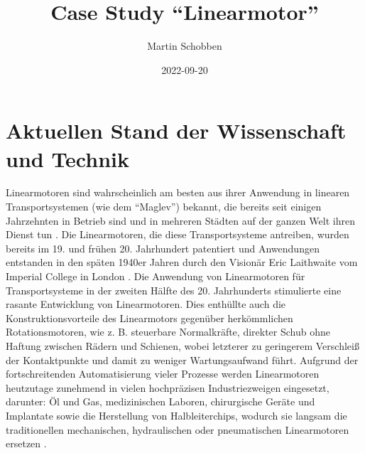 \documentclass[
  oneside]{book}
\title{Case Study ``Linearmotor''}
\author{Martin Schobben}
\date{2022-09-20}
\begin{document}
\maketitle

{
\setcounter{tocdepth}{1}
\tableofcontents
}
\hypertarget{aktuellen-stand-der-wissenschaft-und-technik}{%
\section{Aktuellen Stand der Wissenschaft und Technik}\label{aktuellen-stand-der-wissenschaft-und-technik}}

Linearmotoren sind wahrscheinlich am besten aus ihrer Anwendung in linearen Transportsystemen (wie dem ``Maglev'') bekannt, die bereits seit einigen Jahrzehnten in Betrieb sind und in mehreren Städten auf der ganzen Welt ihren Dienst tun \citep{hellinger2009, palka2021}. Die Linearmotoren, die diese Transportsysteme antreiben, wurden bereits im 19. und frühen 20. Jahrhundert patentiert und Anwendungen entstanden in den späten 1940er Jahren durch den Visionär Eric Laithwaite vom Imperial College in London \citep{hellinger2009}. Die Anwendung von Linearmotoren für Transportsysteme in der zweiten Hälfte des 20. Jahrhunderts stimulierte eine rasante Entwicklung von Linearmotoren. Dies enthüllte auch die Konstruktionsvorteile des Linearmotors gegenüber herkömmlichen Rotationsmotoren, wie z. B. steuerbare Normalkräfte, direkter Schub ohne Haftung zwischen Rädern und Schienen, wobei letzterer zu geringerem Verschleiß der Kontaktpunkte und damit zu weniger Wartungsaufwand führt. Aufgrund der fortschreitenden Automatisierung vieler Prozesse werden Linearmotoren heutzutage zunehmend in vielen hochpräzisen Industriezweigen eingesetzt, darunter: Öl und Gas, medizinischen Laboren, chirurgische Geräte und Implantate sowie die Herstellung von Halbleiterchips, wodurch sie langsam die traditionellen mechanischen, hydraulischen oder pneumatischen Linearmotoren ersetzen \citep{gieras2018}.
\end{document}
